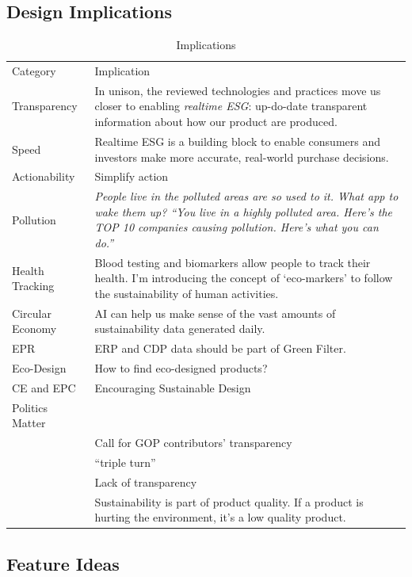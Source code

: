 \documentclass[
  letterpaper,
  DIV=11,
  numbers=noendperiod]{scrartcl}
\begin{document}
\subsection{Design Implications}\label{design-implications-1}

\begin{longtable}[]{@{}
  >{\raggedright\arraybackslash}p{}
  >{\raggedright\arraybackslash}p{}@{}}
\caption{Implications}\tabularnewline
\toprule\noalign{}
\endfirsthead
\endhead
\bottomrule\noalign{}
\endlastfoot
Category & Implication \\
Transparency & In unison, the reviewed technologies and practices move
us closer to enabling \emph{realtime ESG}: up-do-date transparent
information about how our product are produced. \\
Speed & Realtime ESG is a building block to enable consumers and
investors make more accurate, real-world purchase decisions. \\
Actionability & Simplify action \\
Pollution & \emph{People live in the polluted areas are so used to it.
What app to wake them up? ``You live in a highly polluted area. Here's
the TOP 10 companies causing pollution. Here's what you can do.''} \\
Health Tracking & Blood testing and biomarkers allow people to track
their health. I'm introducing the concept of `eco-markers' to follow the
sustainability of human activities. \\
Circular Economy & AI can help us make sense of the vast amounts of
sustainability data generated daily. \\
EPR & ERP and CDP data should be part of Green Filter. \\
Eco-Design & How to find eco-designed products? \\
CE and EPC & Encouraging Sustainable Design \\
Politics Matter & \\
& Call for GOP contributors' transparency \\
& ``triple turn'' \\
& Lack of transparency \\
& Sustainability is part of product quality. If a product is hurting the
environment, it's a low quality product. \\
\end{longtable}

\subsection{Feature Ideas}\label{feature-ideas-1}
\end{document}
